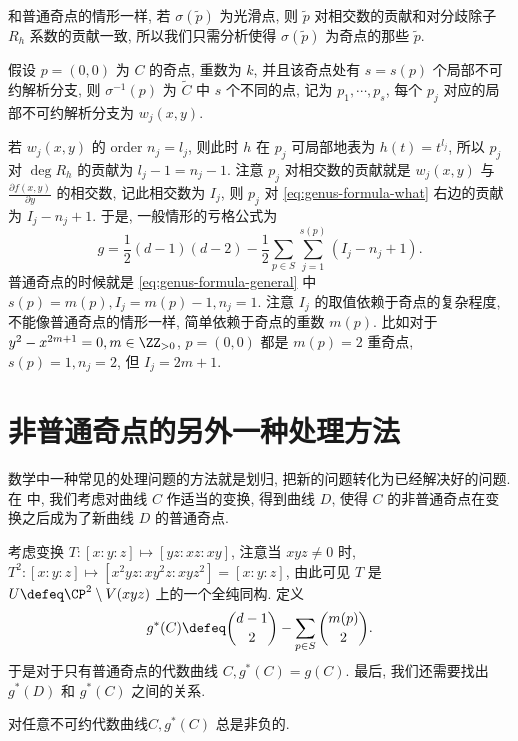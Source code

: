 和普通奇点的情形一样, 若 $\sigma(\tilde{p})$ 为光滑点,
则 $\tilde{p}$ 对相交数的贡献和对分歧除子 $R_h$ 系数的贡献一致,
所以我们只需分析使得 $\sigma(\tilde{p})$ 为奇点的那些 $\tilde{p}$.

假设 $p = (0,0)$ 为 $C$ 的奇点, 重数为 $k$,
并且该奇点处有 $s = s(p)$ 个局部不可约解析分支,
则 $\sigma^{-1}(p)$ 为 $\tilde{C}$ 中 $s$ 个不同的点,
记为 $p_1,\cdots, p_s$, 每个 $p_j$ 对应的局部不可约解析分支为 $w_j(x,y)$.

若 $w_j(x,y)$ 的 order $n_j = l_j$,
则此时 $h$ 在 $p_j$ 可局部地表为 $h(t) = t^{l_j}$,
所以 $p_j$ 对 $\deg R_h$ 的贡献为 $l_j - 1 = n_j - 1$.
注意 $p_j$ 对相交数的贡献就是 $w_j(x,y)$ 与 $\frac{\partial f(x,y)}{\partial y}$ 的相交数,
记此相交数为 $I_j$,
则 $p_j$ 对 \cref{eq:genus-formula-what} 右边的贡献为 $I_j - n_j + 1$.
于是, 一般情形的亏格公式为
\begin{equation}
\label{eq:genus-formula-general}
g = \frac{1}{2}(d-1)(d-2) - \frac{1}{2}\sum_{p\in S}\sum_{j=1}^{s(p)}(I_j - n_j + 1).
\end{equation}
普通奇点的时候就是 \cref{eq:genus-formula-general} 中
$s(p) = m(p), I_j = m(p) - 1, n_j = 1$.
注意 $I_j$ 的取值依赖于奇点的复杂程度,
不能像普通奇点的情形一样, 简单依赖于奇点的重数 $m(p)$.
比如对于 $y^2 - x^{2m+1} = 0, m \in \ZZ_{>0}$,
$p = (0,0)$ 都是 $m(p) = 2$ 重奇点, $s(p) = 1, n_j = 2$,
但 $I_j = 2m + 1$.

\section{非普通奇点的另外一种处理方法}

数学中一种常见的处理问题的方法就是划归,
把新的问题转化为已经解决好的问题.
在 \cite{notes} 中, 我们考虑对曲线 $C$ 作适当的变换,
得到曲线 $D$, 使得 $C$ 的非普通奇点在变换之后成为了新曲线 $D$ 的普通奇点.

考虑变换 $T: [x:y:z]\mapsto [yz:xz:xy]$,
注意当 $xyz \ne 0$ 时, $T^2: [x:y:z]\mapsto [x^2yz:xy^2z:xyz^2] = [x:y:z]$,
由此可见 $T$ 是 $U \defeq \CP^2\setminus V(xyz)$ 上的一个全纯同构. 定义
\begin{equation}
\label{eq:psuedo-genus}
g^*(C) \defeq \binom{d-1}{2} - \sum_{p \in S}\binom{m(p)}{2}.
\end{equation}
于是对于只有普通奇点的代数曲线 $C, g^*(C) = g(C)$.
最后, 我们还需要找出 $g^*(D)$ 和 $g^*(C)$ 之间的关系.

\begin{lem}
\label{lem:pseudo-genus-always-non-negative}
对任意不可约代数曲线$C, g^*(C)$ 总是非负的.
\end{lem}

